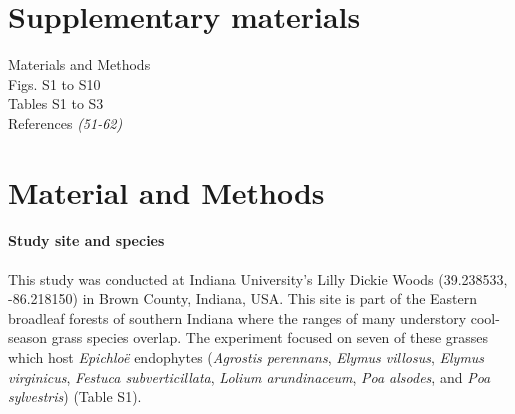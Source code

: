 \documentclass[12pt]{article}
\begin{document}

\section*{Supplementary materials}
Materials and Methods\\


Figs. S1 to S10\\
Tables S1 to S3\\
References \textit{(51-62)}


\section*{Material and Methods}
\paragraph*{Study site and species}
This study was conducted at Indiana University's Lilly Dickie Woods (39.238533, -86.218150) in Brown County, Indiana, USA. 
This site is part of the Eastern broadleaf forests of southern Indiana where the ranges of many understory cool-season grass species overlap. 
The experiment focused on seven of these grasses which host \emph{Epichlo\"e} endophytes (\emph{Agrostis perennans}, \emph{Elymus villosus}, \emph{Elymus virginicus}, \emph{Festuca subverticillata}, \emph{Lolium arundinaceum}, \emph{Poa alsodes}, and \emph{Poa sylvestris}) (Table S1). 
\end{document}
